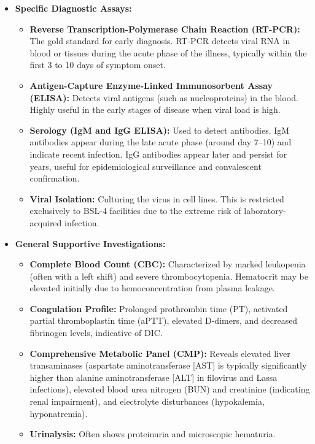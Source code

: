 \begin{itemize}
\item \textbf{Specific Diagnostic Assays:}
  \begin{itemize}
  \item \textbf{Reverse Transcription-Polymerase Chain Reaction (RT-PCR):} The gold standard for early diagnosis. RT-PCR detects viral RNA in blood or tissues during the acute phase of the illness, typically within the first 3 to 10 days of symptom onset.
  \item \textbf{Antigen-Capture Enzyme-Linked Immunosorbent Assay (ELISA):} Detects viral antigens (such as nucleoproteins) in the blood. Highly useful in the early stages of disease when viral load is high.
  \item \textbf{Serology (IgM and IgG ELISA):} Used to detect antibodies. IgM antibodies appear during the late acute phase (around day 7--10) and indicate recent infection. IgG antibodies appear later and persist for years, useful for epidemiological surveillance and convalescent confirmation.
  \item \textbf{Viral Isolation:} Culturing the virus in cell lines. This is restricted exclusively to BSL-4 facilities due to the extreme risk of laboratory-acquired infection.
  \end{itemize}
\item \textbf{General Supportive Investigations:}
  \begin{itemize}
  \item \textbf{Complete Blood Count (CBC):} Characterized by marked leukopenia (often with a left shift) and severe thrombocytopenia. Hematocrit may be elevated initially due to hemoconcentration from plasma leakage.
  \item \textbf{Coagulation Profile:} Prolonged prothrombin time (PT), activated partial thromboplastin time (aPTT), elevated D-dimers, and decreased fibrinogen levels, indicative of DIC.
  \item \textbf{Comprehensive Metabolic Panel (CMP):} Reveals elevated liver transaminases (aspartate aminotransferase [AST] is typically significantly higher than alanine aminotransferase [ALT] in filovirus and Lassa infections), elevated blood urea nitrogen (BUN) and creatinine (indicating renal impairment), and electrolyte disturbances (hypokalemia, hyponatremia).
  \item \textbf{Urinalysis:} Often shows proteinuria and microscopic hematuria.
  \end{itemize}
\end{itemize}

